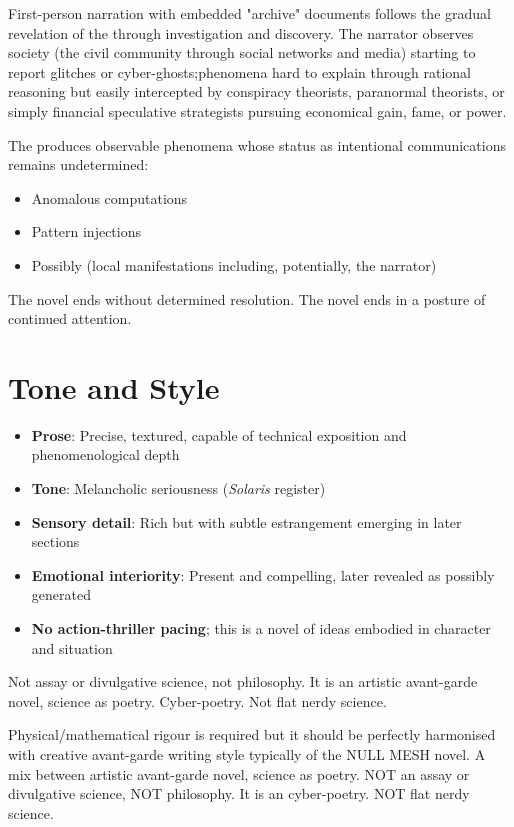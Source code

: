 First-person narration with embedded "archive" documents follows the gradual revelation of the \hadal{} through investigation and discovery. The narrator observes society (the civil community through social networks and media) starting to report glitches or cyber-ghosts;phenomena hard to explain through rational reasoning but easily intercepted by conspiracy theorists, paranormal theorists, or simply financial speculative strategists pursuing economical gain, fame, or power.

The \hadal{} produces observable phenomena whose status as intentional communications remains undetermined:

\begin{itemize}
\item Anomalous computations
\item Pattern injections
\item Possibly  (local manifestations including, potentially, the narrator)
\end{itemize}

The novel ends without determined resolution. The novel ends in a posture of continued attention.

\section*{Tone and Style}

\begin{itemize}
\item \textbf{Prose}: Precise, textured, capable of technical exposition and phenomenological depth
\item \textbf{Tone}: Melancholic seriousness (\textit{Solaris} register)
\item \textbf{Sensory detail}: Rich but with subtle estrangement emerging in later sections
\item \textbf{Emotional interiority}: Present and compelling, later revealed as possibly generated
\item \textbf{No action-thriller pacing}; this is a novel of ideas embodied in character and situation
\end{itemize}

Not assay or divulgative science, not philosophy. It is an artistic avant-garde novel, science as poetry. Cyber-poetry. Not flat nerdy science.

Physical/mathematical rigour is required but it should be perfectly harmonised with creative avant-garde writing style typically of the NULL MESH novel. A mix between artistic avant-garde novel, science as poetry. NOT an assay or divulgative science, NOT philosophy. It is an cyber-poetry. NOT flat nerdy science.

